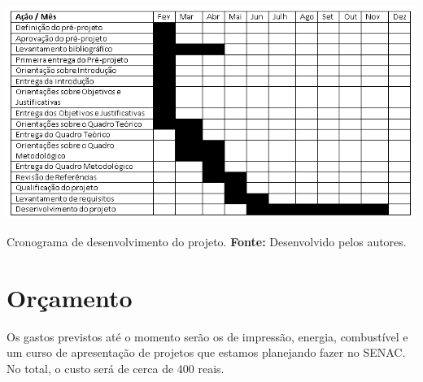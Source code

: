 \begin{table}[ht!]
\centering
\includegraphics[width=150mm]{./imagens/tabela.jpg}
\caption{Cronograma de desenvolvimento do projeto. \textbf{Fonte:} Desenvolvido
pelos autores.}
\end{table}
\newpage

\section{Orçamento}

\par Os gastos previstos até o momento serão os de impressão, energia, combustível e um
curso de apresentação de projetos que estamos planejando fazer no SENAC. No
total, o custo será de cerca de 400 reais. 

